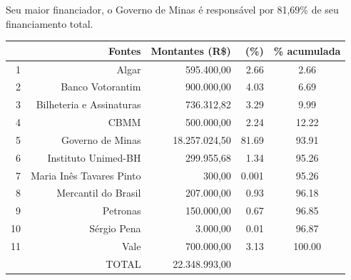 \documentclass[a4paper, 12pt, openright, oneside, german, french, english, brazil]{abntex2}
\begin{document}









	Seu maior financiador, o Governo de Minas é responsável por 81,69\% de seu financiamento total.





	\begin{table}[ht]
		{\begin{tabular}{rrrrc}
				\hline
				& Fontes & Montantes (R\$) & (\%) & \% acumulada \\
				\hline
				1 & Algar & 595.400,00 & 2.66 & 2.66 \\
				2 & Banco Votorantim & 900.000,00 & 4.03 & 6.69 \\
				3 & Bilheteria e Assinaturas & 736.312,82 & 3.29 & 9.99 \\
				4 & CBMM & 500.000,00 & 2.24 & 12.22 \\
				5 & Governo de Minas & 18.257.024,50 & 81.69 & 93.91 \\
				6 & Instituto Unimed-BH & 299.955,68 & 1.34 & 95.26 \\
				7 & Maria Inês Tavares Pinto & 300,00 & 0.001 & 95.26 \\
				8 & Mercantil do Brasil & 207.000,00 & 0.93 & 96.18 \\
				9 & Petronas & 150.000,00 & 0.67 & 96.85 \\
				10 & Sérgio Pena & 3.000,00 & 0.01 & 96.87 \\
				11 & Vale & 700.000,00 & 3.13 & 100.00 \\
				\hline
				& TOTAL & 22.348.993,00 &  & \\
				\hline
			\end{tabular}
		}
		{
		}
	\end{table}
\end{document}
